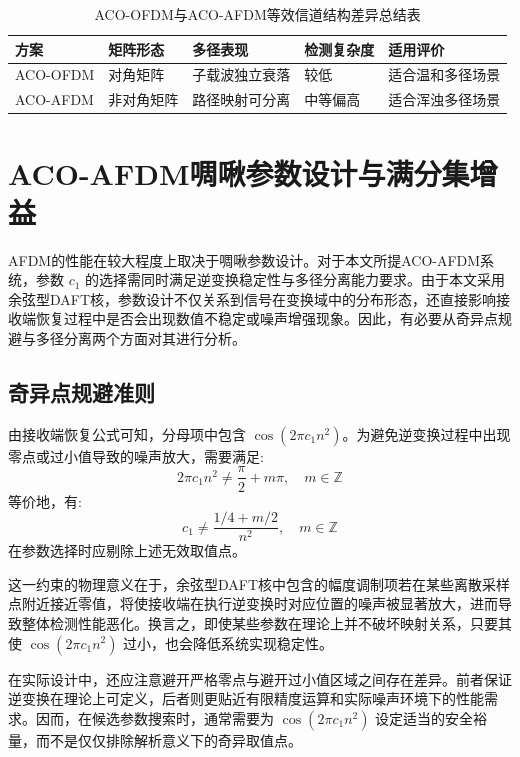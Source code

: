 \begin{table}[htbp]
\centering
\caption{ACO-OFDM与ACO-AFDM等效信道结构差异总结表}
\label{tab:channel_structure_difference}
\footnotesize
\setlength{\tabcolsep}{4pt}
\begin{tabular}{p{1.8cm}p{2.0cm}p{2.3cm} l p{3.2cm}}
\toprule
方案 & 矩阵形态 & 多径表现 & 检测复杂度 & 适用评价 \\
\midrule
ACO-OFDM& 对角矩阵 & 子载波独立衰落 & 较低 & 适合温和多径场景 \\
ACO-AFDM& 非对角矩阵 & 路径映射可分离 & 中等偏高 & 适合浑浊多径场景 \\
\bottomrule
\end{tabular}
\end{table}

\section{ACO-AFDM啁啾参数设计与满分集增益}
\label{sec:aco_afdm_params}

AFDM的性能在较大程度上取决于啁啾参数设计。对于本文所提ACO-AFDM系统，参数 $c_1$ 的选择需同时满足逆变换稳定性与多径分离能力要求。由于本文采用余弦型DAFT核，参数设计不仅关系到信号在变换域中的分布形态，还直接影响接收端恢复过程中是否会出现数值不稳定或噪声增强现象。因此，有必要从奇异点规避与多径分离两个方面对其进行分析。

\subsection{奇异点规避准则}
\label{subsec:singularity_avoidance}

由接收端恢复公式可知，分母项中包含 $\cos(2\pi c_1 n^2)$。为避免逆变换过程中出现零点或过小值导致的噪声放大，需要满足:
\begin{equation}
    2\pi c_1 n^2 \neq \frac{\pi}{2} + m\pi, \quad m \in \mathbb{Z}
\end{equation}
等价地，有:
\begin{equation}
    c_1 \neq \frac{1/4 + m/2}{n^2}, \quad m \in \mathbb{Z}
    \label{eq:singularity_condition}
\end{equation}
在参数选择时应剔除上述无效取值点。

这一约束的物理意义在于，余弦型DAFT核中包含的幅度调制项若在某些离散采样点附近接近零值，将使接收端在执行逆变换时对应位置的噪声被显著放大，进而导致整体检测性能恶化。换言之，即使某些参数在理论上并不破坏映射关系，只要其使 $\cos(2\pi c_1 n^2)$ 过小，也会降低系统实现稳定性。

在实际设计中，还应注意避开严格零点与避开过小值区域之间存在差异。前者保证逆变换在理论上可定义，后者则更贴近有限精度运算和实际噪声环境下的性能需求。因而，在候选参数搜索时，通常需要为 $\cos(2\pi c_1 n^2)$ 设定适当的安全裕量，而不是仅仅排除解析意义下的奇异取值点。

